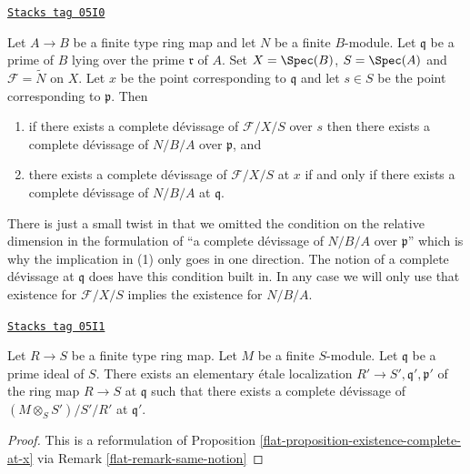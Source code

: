 \begin{remark}
\label{flat-remark-same-notion}
\href{https://stacks.math.columbia.edu/tag/05I0}{\texttt{Stacks tag 05I0}}

Let $A \to B$ be a finite type ring map and let $N$ be a finite
$B$-module. Let $\mathfrak q$ be a prime of $B$ lying over the prime
$\mathfrak r$ of $A$. Set $X = \Spec(B)$, $S = \Spec(A)$ and
$\mathcal{F} = \widetilde{N}$ on $X$. Let $x$ be the point corresponding
to $\mathfrak q$ and let $s \in S$ be the point corresponding to
$\mathfrak p$. Then
\begin{enumerate}
\item if there exists a complete d\'evissage of $\mathcal{F}/X/S$
over $s$ then there exists a complete d\'evissage of
$N/B/A$ over $\mathfrak p$, and
\item there exists a complete d\'evissage of $\mathcal{F}/X/S$
at $x$ if and only if there exists a complete d\'evissage of
$N/B/A$ at $\mathfrak q$.
\end{enumerate}
There is just a small twist in that we omitted the condition on
the relative dimension in the formulation of ``a complete d\'evissage of
$N/B/A$ over $\mathfrak p$'' which is why the implication in (1)
only goes in one direction.
The notion of a complete d\'evissage at
$\mathfrak q$ does have this condition built in. In any case we will
only use that existence for $\mathcal{F}/X/S$
implies the existence for $N/B/A$.
\end{remark}

\begin{lemma}
\label{flat-lemma-existence-algebra}
\href{https://stacks.math.columbia.edu/tag/05I1}{\texttt{Stacks tag 05I1}}

Let $R \to S$ be a finite type ring map.
Let $M$ be a finite $S$-module.
Let $\mathfrak q$ be a prime ideal of $S$.
There exists an elementary \'etale localization
$R' \to S', \mathfrak q', \mathfrak p'$ of
the ring map $R \to S$ at $\mathfrak q$ such that
there exists a complete d\'evissage of
$(M \otimes_S S')/S'/R'$ at $\mathfrak q'$.
\end{lemma}

\begin{proof}

This is a reformulation of
Proposition \ref{flat-proposition-existence-complete-at-x}
via
Remark \ref{flat-remark-same-notion}
\end{proof}

